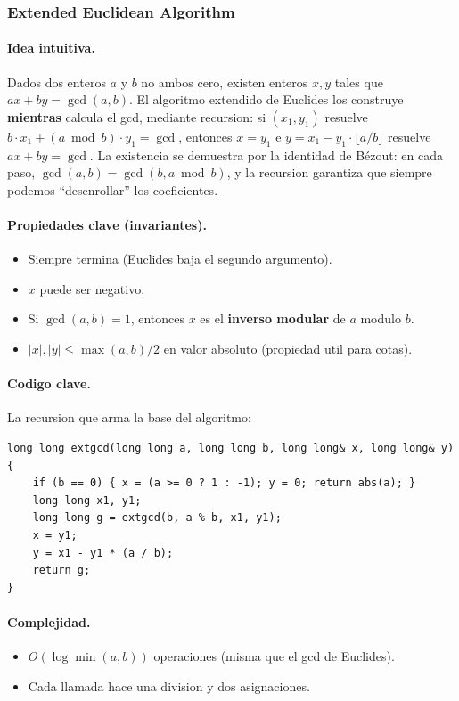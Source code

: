 ﻿\subsubsection{Extended Euclidean Algorithm}

\paragraph{Idea intuitiva.}
Dados dos enteros $a$ y $b$ no ambos cero, existen enteros $x, y$ tales que $ax + by = \gcd(a, b)$. El algoritmo extendido de Euclides los construye \textbf{mientras} calcula el gcd, mediante recursion: si $(x_1, y_1)$ resuelve $b \cdot x_1 + (a \bmod b) \cdot y_1 = \gcd$, entonces $x = y_1$ e $y = x_1 - y_1 \cdot \lfloor a/b \rfloor$ resuelve $ax + by = \gcd$. La existencia se demuestra por la identidad de B\'ezout: en cada paso, $\gcd(a, b) = \gcd(b, a \bmod b)$, y la recursion garantiza que siempre podemos ``desenrollar'' los coeficientes.

\paragraph{Propiedades clave (invariantes).}
\begin{itemize}\setlength\itemsep{0pt}
	\item Siempre termina (Euclides baja el segundo argumento).
	\item $x$ puede ser negativo.
	\item Si $\gcd(a,b) = 1$, entonces $x$ es el \textbf{inverso modular} de $a$ modulo $b$.
	\item $|x|, |y| \le \max(a, b) / 2$ en valor absoluto (propiedad util para cotas).
\end{itemize}

\paragraph{Codigo clave.}
La recursion que arma la base del algoritmo:
\begin{verbatim}
long long extgcd(long long a, long long b, long long& x, long long& y) {
    if (b == 0) { x = (a >= 0 ? 1 : -1); y = 0; return abs(a); }
    long long x1, y1;
    long long g = extgcd(b, a % b, x1, y1);
    x = y1;
    y = x1 - y1 * (a / b);
    return g;
}
\end{verbatim}

\paragraph{Complejidad.}
\begin{itemize}\setlength\itemsep{0pt}
	\item $O(\log \min(a,b))$ operaciones (misma que el gcd de Euclides).
	\item Cada llamada hace una division y dos asignaciones.
\end{itemize}

